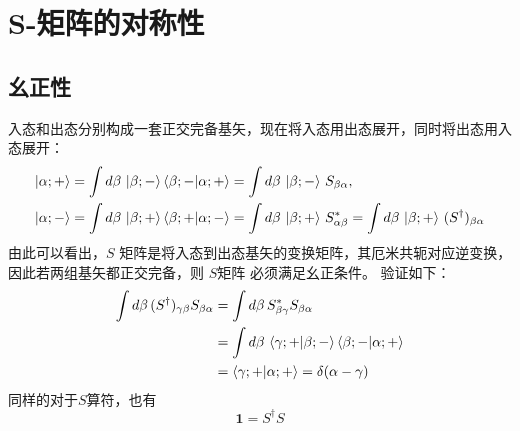 \newpage\section{S-矩阵的对称性}
\subsection{幺正性}
入态和出态分别构成一套正交完备基矢，现在将入态用出态展开，同时将出态用入态展开：
\[\begin{aligned}
                \ket{\alpha;+}
                &=
                \int d\beta \, \ket{\beta;-}
                \braket{\beta;-|\alpha;+}
                =
                \int d\beta \, \ket{\beta;-} \, S_{\beta\alpha},
                \\
                \ket{\alpha;-}
                &=
                \int d\beta \, \ket{\beta;+}
                \braket{\beta;+|\alpha;-}
                =
                \int d\beta \, \ket{\beta;+} \, S^{*}_{\alpha\beta}
                =
                \int d\beta \, \ket{\beta;+} \, (S^\dagger)_{\beta\alpha}
\end{aligned}\]
由此可以看出，$S$ 矩阵是将入态到出态基矢的变换矩阵，其厄米共轭对应逆变换，因此若两组基矢都正交完备，则 $S$矩阵 必须满足幺正条件。
    验证如下：
    \begin{equation}
        \begin{aligned}
        \int d\beta \, (S^\dagger)_{\gamma\beta} S_{\beta\alpha}
        &=
        \int d\beta \, S^{*}_{\beta\gamma} S_{\beta\alpha}
        \\
        &=
        \int d\beta \,
        \braket{\gamma;+|\beta;-}
        \braket{\beta;-|\alpha;+}
        \\
        &=
        \braket{\gamma;+|\alpha;+}
        =
        \delta(\alpha-\gamma)
\end{aligned}
    \end{equation}
    同样的对于$S$算符，也有
    \begin{equation}
        \mathbf{1}=S^\dagger S
    \end{equation}


